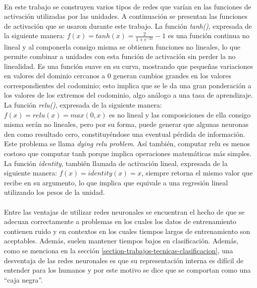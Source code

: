 \paragraph{}En este trabajo se construyen varios tipos de redes que varían en las funciones de activación utilizadas por las unidades. A continuación se presentan las funciones de activación que se usaron durante este trabajo. La función \textit{tanh()}, expresada de la siguiente manera: $f(x) = tanh(x) = \frac{2}{1 + e^{-2x}} - 1 $ es una función continua no lineal y al componerla consigo misma se obtienen funciones no lineales, lo que permite combinar a unidades con esta función de activación sin perder la no linealidad. Es una función suave en su curva, mostrando que pequeñas variaciones en valores del dominio cercanos a 0 generan cambios grandes en los valores correspondientes del codominio; esto implica que se le da una gran ponderación a los valores de los extremos del codominio, algo análogo a una tasa de aprendizaje. La función \textit{relu()}, expresada de la siguiente manera: $f(x) = relu(x) = max(0, x)$ es no lineal y las composiciones de ella consigo misma serán no lineales, pero por su forma, puede generar que algunas neuronas den como resultado cero, constituyéndose una eventual pérdida de información. Este problema se llama \textit{dying relu problem}. Así también, computar relu es menos costoso que computar tanh porque implica operaciones matemáticas más simples. La función \textit{identity}, también llamada de activación lineal, expresada de la siguiente manera: $f(x) = identity(x) = x$, siempre retorna el mismo valor que recibe en su argumento, lo que implica que equivale a una regresión lineal utilizando los pesos de la unidad.

\paragraph{}Entre las ventajas de utilizar redes neuronales se encuentran el hecho de que se adecuan correctamente a problemas en los cuales los datos de entrenamiento contienen ruido y en contextos en los cuales tiempos largos de entrenamiento son aceptables. Además, suelen mantener tiempos bajos en clasificación. Además, como se menciona en la sección \ref{section-trabajos-tecnicas-clasificacion}, una desventaja de las redes neuronales es que su representación interna es difícil de entender para los humanos y por este motivo se dice que se comportan como una “caja negra”.